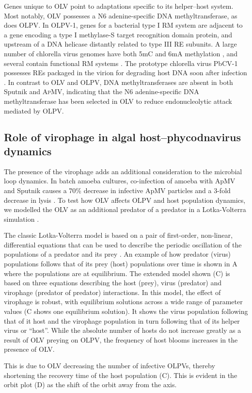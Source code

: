 Genes unique to \ac{OLV} point to adaptations specific to its helper--host system. 
Most notably, \ac{OLV} possesses a N6 adenine-specific \textsc{DNA} methyltransferase, as does \ac{OLPV}. 
In \ac{OLPV}-1, genes for a bacterial type I \ac{RM} system are adjacent to a gene encoding a type I methylase-S target recognition domain protein, and upstream of a \textsc{DNA} helicase distantly related to type III \ac{RE} subunits. 
A large number of chlorella virus genomes have both 5mC and 6mA methylation \cite{VanEtten1991}, and several contain functional \ac{RM} systems \cite{Nelson1993}. 
The prototype chlorella virus PbCV-1 possesses REs packaged in the virion for degrading host \textsc{DNA} soon after infection \cite{Agarkova2006}. 
In contrast to \ac{OLV} and \ac{OLPV}, \textsc{DNA} methyltransferases are absent in both Sputnik and \textsc{ApMV}, indicating that the N6 adenine-specific \textsc{DNA} methyltransferase has been selected in \ac{OLV} to reduce endonucleolytic attack mediated by \ac{OLPV}. 

\subsection[Virophage in algal host--phycodnavirus dynamics]{Role of virophage in algal host--phycodnavirus dynamics}
The presence of the virophage adds an additional consideration to the microbial loop dynamics. 
In batch amoeba cultures, co-infection of amoeba with \ac{ApMV} and Sputnik causes a 70\% decrease in infective \ac{ApMV} particles and a 3-fold decrease in lysis \cite{LaScola2008}. 
To test how \ac{OLV} affects \ac{OLPV} and host population dynamics, we modelled the \ac{OLV} as an additional predator of a predator in a Lotka-Volterra simulation .
 
The classic Lotka-Volterra model \cite{Lotka1910} is based on a pair of first-order, non-linear, differential equations that can be used to describe the periodic oscillation of the populations of a predator and its prey \cite{Volterra1926}. 
An example of how predator (virus) populations follows that of its prey (host) populations over time is shown in A where the populations are at equilibrium.
The extended model shown (C) is based on three equations describing the host (prey), virus (predator) and virophage (predator of predator) interactions. 
In this model, the effect of virophage is robust, with equilibrium solutions across a wide range of parameter values (C shows one equilibrium solution).
It shows the virus population following that of it host and the virophage population in turn following that of its helper virus or ``host''. While the absolute number of hosts do not increase greatly as a result of \ac{OLV} preying on \ac{OLPV}, the frequency of host blooms increases in the presence of \ac{OLV}. 

This is due to \ac{OLV} decreasing the number of infective \acp{OLPV}, thereby shortening the recovery time of the host population (C).
This is evident in the orbit plot (D) as the shift of the orbit away from the axis. 


